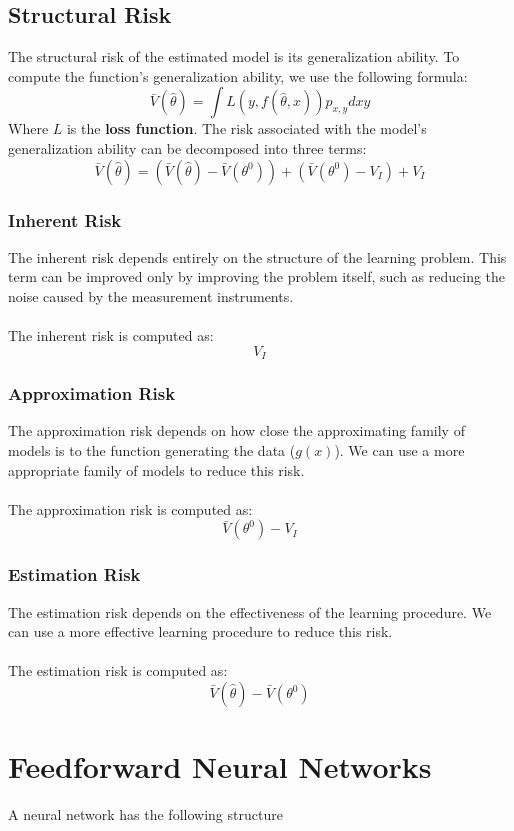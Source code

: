 \documentclass{article}
\begin{document}
\subsection{Structural Risk}
The structural risk of the estimated model is its generalization ability. To compute the function's generalization ability, we use the following formula:
\[ \bar V(\hat\theta) = \int L(y, f(\hat\theta, x)) p_{x, y} dxy \]
Where $L$ is the \textbf{loss function}. The risk associated with the model's generalization ability can be decomposed into three terms:
\[ \bar V(\hat\theta) = (\bar V(\hat\theta) - \bar V(\theta^0)) + (\bar V(\theta^0) - V_I) + V_I \]

\subsubsection{Inherent Risk}
The inherent risk depends entirely on the structure of the learning problem. This term can be improved only by improving the problem itself, such as reducing the noise caused by the measurement instruments. \\ \\
The inherent risk is computed as:
\[ V_I \]

\subsubsection{Approximation Risk}
The approximation risk depends on how close the approximating family of models is to the function generating the data ($g(x)$). We can use a more appropriate family of models to reduce this risk. \\ \\
The approximation risk is computed as:
\[ \bar V(\theta^0) - V_I \]

\subsubsection{Estimation Risk}
The estimation risk depends on the effectiveness of the learning procedure. We can use a more effective learning procedure to reduce this risk. \\ \\
The estimation risk is computed as:
\[ \bar V(\hat\theta) - \bar V(\theta^0) \]

\section{Feedforward Neural Networks}
A neural network has the following structure \\ \\
\end{document}
